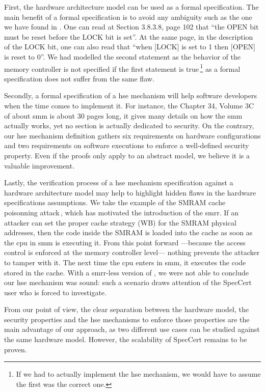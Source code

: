 First, the hardware architecture model can be used as a formal specification.
%
The main benefit of a formal specification is to avoid any ambiguity such as the
one we have found in \cite{intel2009mch}.
%
One can read at Section 3.8.3.8, page 102 that ``the OPEN bit must be reset
before the LOCK bit is set''.
%
At the same page, in the description of the LOCK bit, one can also read that
``when [LOCK] is set to 1 then [OPEN] is reset to 0''.
%
We had modelled the second statement as the behavior of the memory controller is
not specified if the first statement is true\,\footnote{If we had to actually
  implement the \ac{hse} mechanism, we would have to assume the first was the
  correct one.}   as a formal specification does not suffer
from the same flaw.

Secondly, a formal specification of a \ac{hse} mechanism will help software
developers when the time comes to implement it.
%
For instance, the Chapter 34, Volume 3C of \cite{intel2014manual} about \ac{smm}
is about 30 pages long, it gives many details on how the \ac{smm} actually
works, yet no section is actually dedicated to security.
%
On the contrary, our \ac{hse} mechanism definition gathers six requirements on
hardware configurations and two requirements on software executions to enforce a
well-defined security property.
%
Even if the proofs only apply to an abstract model, we believe it is a valuable
improvement.

Lastly, the verification process of a \ac{hse} mechanism specification against a
hardware architecture model may help to highlight hidden flaws in the hardware
specifications assumptions.
%
We take the example of the SMRAM cache poisonning
attack\,\cite{wojtczuk2009smram,duflot2009smram}, which has motivated the
introduction of the \ac{smrr}.
%
If an attacker can set the proper cache strategy (WB) for the SMRAM physical
addresses, then the code inside the SMRAM is loaded into the cache as soon as
the \ac{cpu} in \ac{smm} is executing it.
%
From this point forward ---because the access control is enforced at the memory
controller level--- nothing prevents the attacker to tamper with it.
%
The next time the \ac{cpu} enters in \ac{smm}, it executes the code stored in
the cache. With a \ac{smrr}-less version of , we were not able
to conclude our \ac{hse} mechanism was sound: such a scenario draws attention of
the SpecCert user who is forced to investigate.

From our point of view, the clear separation between the hardware model, the
security properties and the \ac{hse} mechanisms to enforce those properties are
the main advantage of our approach, as two different use cases can be studied
against the same hardware model.
%
However, the scalability of SpecCert remains to be proven.

